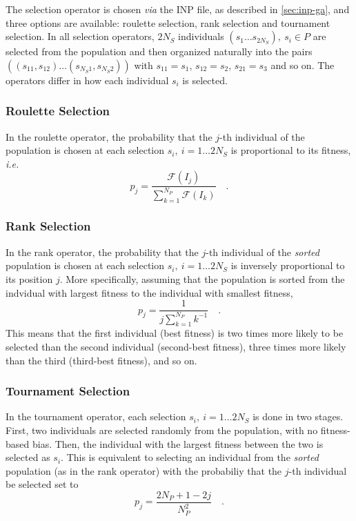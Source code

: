 \documentclass[10pt,a4paper]{report}
\numberwithin{equation}{section}
\begin{document}
The selection operator is chosen \textit{via} the INP file, as described in \autoref{sec:inp-ga}, and three options are available: roulette selection, rank selection and tournament selection.
In all selection operators, $2N_S$ individuals
$(s_1\ldots s_{2N_S}),\ s_i \in P$ are selected from the population and then
organized naturally into the pairs
$((s_{11},s_{12})\ldots (s_{N_S 1},s_{N_S 2}))$ with $s_{11}=s_{1}$,
$s_{12}=s_{2}$, $s_{21}=s_{3}$ and so on. The operators differ in how each
individual $s_i$ is selected.

\subsubsection{Roulette Selection}
\label{sec:ga-selection-roulette}

In the roulette operator, the probability that the
$j$-th individual of the population is chosen at each selection $s_i,\ i=1\ldots 2N_S$ is
proportional to its fitness, \textit{i.e.}
\begin{equation}
  \label{eq:ga-sel-roulette}
  p_j = \frac{\mathcal{F}(I_j)}{\sum_{k=1}^{N_P} \mathcal{F}(I_k)} \quad .
\end{equation}

\subsubsection{Rank Selection}
\label{sec:ga-selection-rank}

In the rank operator, the probability that the $j$-th individual of the
\textit{sorted} population is chosen at each selection $s_i,\ i=1\ldots 2N_S$ 
is inversely proportional to its position $j$. More specifically, assuming that
the population is sorted from the indvidual with largest fitness to the
individual with smallest fitness,
\begin{equation}
  \label{eq:ga-sel-rank}
  p_j = \frac{1}{j\sum_{k=1}^{N_P} k^{-1}} \quad .
\end{equation}
This means that the first individual (best fitness) is two times more likely to
be selected than the second individual (second-best fitness), three times more
likely than the third (third-best fitness), and so on.

\subsubsection{Tournament Selection}
\label{sec:ga-selection-tournament}

In the tournament operator, each selection $s_i,\ i=1\ldots 2N_S$ is done in two
stages.  First, two individuals are selected randomly from the population, with
no fitness-based bias.  Then, the individual with the largest fitness between the
two is selected as $s_i$.  This is equivalent to selecting an individual from the
\textit{sorted} population (as in the rank operator) with the probabiliy that the
$j$-th individual be selected set to 
\begin{equation}
  \label{eq:ga-sel-tournamnt}
  p_j = \frac{2N_P + 1 - 2j}{N_P^2} \quad .
\end{equation}
\end{document}
